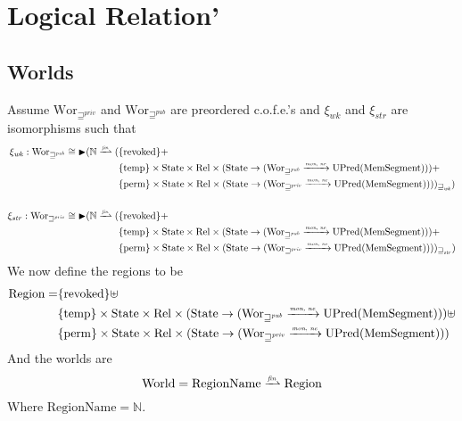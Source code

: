 \documentclass[a4paper]{article}
\newcommand{\finparfun}{\xrightharpoonup{\textit{\tiny{fin}}}}
\newcommand{\monnefun}{\xrightarrow{\textit{\tiny{mon, ne}}}}
\newcommand{\fun}{\rightarrow}
\newcommand{\blater}{\mathop{\blacktriangleright}}
\newcommand{\cofe}{c.o.f.e.}
\newcommand{\cofes}{\cofe{}'s}
\newcommand{\var}[1]{\mathit{#1}}
\newcommand{\future}{\mathbin{\sqsupseteq}}
\newcommand{\futurewk}{\mathbin{\sqsupseteq}^{\var{pub}}}
\newcommand{\futurestr}{\mathbin{\sqsupseteq}^{\var{priv}}}
\newcommand{\plaindom}[1]{\mathrm{#1}}
\newcommand{\HeapSegments}{\plaindom{MemSegment}}
\newcommand{\nats}{\mathbb{N}}
\newcommand{\Rel}{\plaindom{Rel}}
\newcommand{\States}{\plaindom{State}}
\newcommand{\RegionNames}{\plaindom{RegionName}}
\newcommand{\Regions}{\plaindom{Region}}
\newcommand{\Worlds}{\plaindom{World}}
\newcommand{\Wor}{\plaindom{Wor}}
\newcommand{\Worwk}{\Wor_{\futurewk}}
\newcommand{\Worstr}{\Wor_{\futurestr}}
\newcommand{\UPred}[1]{\plaindom{UPred}(#1)}
\newcommand{\plainview}[1]{\mathrm{#1}}
\newcommand{\perma}{\plainview{perm}}
\newcommand{\temp}{\plainview{temp}}
\newcommand{\revoked}{\plainview{revoked}}
\begin{document}
\section{Logical Relation'}
\subsection{Worlds}
Assume $\Worstr$ and $\Worwk$ are preordered \cofes{} and $\xi_{\var{wk}}$ and $\xi_{\var{str}}$ are isomorphisms such that
\begin{align*}
  \xi_{\var{wk}} :   \Worwk \cong \blater (\nats \finparfun (   & \{\revoked\} + \\
                                                                & \{\temp\} \times \States \times \Rel \times (\States \fun (\Worwk \monnefun \UPred{\HeapSegments})) + \\
                                                                & \{\perma\} \times \States \times \Rel \times (\States \fun (\Worstr \monnefun \UPred{\HeapSegments})))_{\future_{\var{wk}}}) \\ \\
  \xi_{\var{str}} :   \Worstr \cong \blater (\nats \finparfun ( & \{\revoked\} + \\
                                                                & \{\temp\} \times \States \times \Rel \times (\States \fun (\Worwk \monnefun \UPred{\HeapSegments})) + \\
                                                                & \{\perma\} \times \States \times \Rel \times (\States \fun (\Worstr \monnefun \UPred{\HeapSegments})))_{\future_{\var{str}}})
\end{align*}
We now define the regions to be
\begin{align*}
  \Regions = & \{\revoked\} \uplus \\
             & \{\temp\} \times \States \times \Rel \times (\States \fun (\Worwk \monnefun \UPred{\HeapSegments})) \uplus \\
             & \{\perma\} \times \States \times \Rel \times (\States \fun (\Worstr \monnefun \UPred{\HeapSegments}))
\end{align*}
And the worlds are
\[
  \Worlds = \RegionNames \finparfun \Regions
\]
Where $\RegionNames = \nats$.
\end{document}
